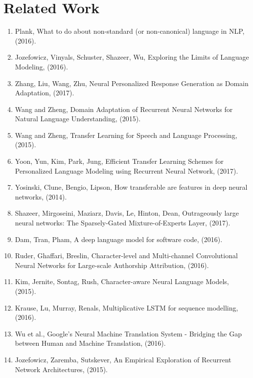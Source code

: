 \documentclass[12pt,letterpaper]{article}
\theoremstyle{remark}
\theoremstyle{plain}
\begin{document}








\section{Related Work}

\begin{enumerate}
\item Plank, What to do about non-standard (or non-canonical) language in NLP, (2016).
\item Jozefowicz, Vinyals, Schuster, Shazeer, Wu, Exploring the Limits of Language Modeling, (2016).
\item Zhang, Liu, Wang, Zhu, Neural Personalized Response Generation as Domain Adaptation, (2017).
\item Wang and Zheng, Domain Adaptation of Recurrent Neural Networks for Natural Language Understanding, (2015).
\item Wang and Zheng, Transfer Learning for Speech and Language Processing, (2015).
\item Yoon, Yun, Kim, Park, Jung, Efficient Transfer Learning Schemes for Personalized Language Modeling using Recurrent Neural Network, (2017).
\item Yosinski, Clune, Bengio, Lipson, How transferable are features in deep neural networks, (2014).
\item Shazeer, Mirgoseini, Maziarz, Davis, Le, Hinton, Dean, Outrageously large neural networks: The Sparsely-Gated Mixture-of-Experts Layer, (2017).
\item Dam, Tran, Pham, A deep language model for software code, (2016).
\item Ruder, Ghaffari, Breslin, Character-level and Multi-channel Convolutional Neural Networks for Large-scale Authorship Attribution, (2016).
\item Kim, Jernite, Sontag, Rush, Character-aware Neural Language Models, (2015).
\item Krause, Lu, Murray, Renals, Multiplicative LSTM for sequence modelling, (2016).
\item Wu et al., Google's Neural Machine Translation System - Bridging the Gap between Human and Machine Translation, (2016). \label{Wu2016}
\item Jozefowicz, Zaremba, Sutskever, An Empirical Exploration of Recurrent Network Architectures, (2015). \label{Jozefowicz2015}
\end{enumerate}
\end{document}
